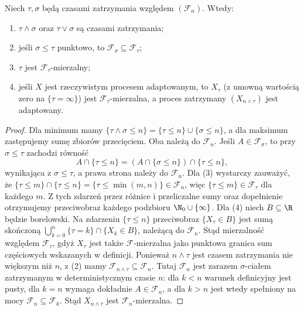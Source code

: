 \begin{lemat}
Niech $\tau,\sigma$ będą czasami zatrzymania
względem $(\mathcal F_n)$. Wtedy:
\begin{enumerate}
\item $\tau\wedge\sigma$ oraz $\tau\vee\sigma$ są czasami zatrzymania;
\item jeśli $\sigma\leq\tau$ punktowo, to
  $\mathcal F_\sigma\subseteq\mathcal F_\tau$;
\item $\tau$ jest $\mathcal F_\tau$-mierzalny;
\item jeśli $X$ jest rzeczywistym procesem adaptowanym,
  to $X_\tau$ (z umowną wartością zero na
  $\{\tau=\infty\}$) jest $\mathcal F_\tau$-mierzalna,
  a proces zatrzymany $(X_{n\wedge\tau})$ jest adaptowany.
\end{enumerate}
\end{lemat}
\begin{proof}
Dla minimum mamy
$\{\tau\wedge\sigma\leq n\}=
\{\tau\leq n\}\cup\{\sigma\leq n\}$,
a dla maksimum zastępujemy sumę zbiorów
przecięciem. Oba należą do $\mathcal F_n$.
Jeśli $A\in\mathcal F_\sigma$, to przy
$\sigma\leq\tau$ zachodzi równość
\[
A\cap\{\tau\leq n\}
=(A\cap\{\sigma\leq n\})\cap\{\tau\leq n\},
\]
wynikająca z $\sigma\leq\tau$, a prawa strona
należy do $\mathcal F_n$.
Dla (3) wystarczy zauważyć, że
$\{\tau\leq m\}\cap\{\tau\leq n\}
=\{\tau\leq\min(m,n)\}\in\mathcal F_n$,
więc $\{\tau\leq m\}\in\mathcal F_\tau$ dla każdego $m$.
Z tych zdarzeń przez różnice i przeliczalne
sumy oraz dopełnienie otrzymujemy przeciwobraz
każdego podzbioru $\N_0\cup\{\infty\}$.
Dla (4) niech $B\subseteq\R$ będzie borelowski.
Na zdarzeniu $\{\tau\leq n\}$ przeciwobraz
$\{X_\tau\in B\}$ jest sumą skończoną
$\bigcup_{k=0}^n\{\tau=k\}\cap\{X_k\in B\}$,
należącą do $\mathcal F_n$. Stąd mierzalność
względem $\mathcal F_\tau$, gdyż $X_\tau$
jest także $\mathcal F$-mierzalna jako punktowa
granica sum częściowych wskazanych w definicji.
Ponieważ $n\wedge\tau$ jest czasem zatrzymania
nie większym niż $n$, z (2) mamy
$\mathcal F_{n\wedge\tau}\subseteq\mathcal F_n$.
Tutaj $\mathcal F_n$ jest zarazem $\sigma$-ciałem
zatrzymanym w deterministycznym czasie $n$:
dla $k<n$ warunek definicyjny jest pusty,
dla $k=n$ wymaga dokładnie $A\in\mathcal F_n$,
a dla $k>n$ jest wtedy spełniony na mocy
$\mathcal F_n\subseteq\mathcal F_k$.
Stąd $X_{n\wedge\tau}$ jest $\mathcal F_n$-mierzalna.
\end{proof}

